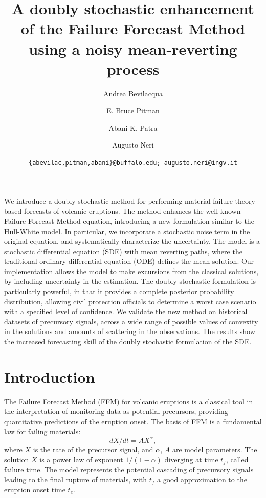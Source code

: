 \documentclass{article}
\begin{document}
\title{\bf A doubly stochastic enhancement of the Failure Forecast Method using a noisy mean-reverting process}
\author[1]{Andrea Bevilacqua}
\author[2]{E. Bruce Pitman}
\author[3,4]{Abani K. Patra}
\author[5]{Augusto Neri}


\date{\texttt{\{abevilac,pitman,abani\}@buffalo.edu; augusto.neri@ingv.it}}


\maketitle
\abstract
We introduce a doubly stochastic method for performing material failure theory based forecasts of volcanic eruptions. The method enhances the well known Failure Forecast Method equation, introducing a new formulation similar to the Hull-White model. In particular, we incorporate a stochastic noise term in the original equation, and systematically characterize the uncertainty. The model is a stochastic differential equation (SDE) with mean reverting paths, where the traditional ordinary differential equation (ODE) defines the mean solution. Our implementation allows the model to make excursions from the classical solutions, by including uncertainty in the estimation. The doubly stochastic formulation is particularly powerful, in that it provides a complete posterior probability distribution, allowing civil protection officials to determine a worst case scenario with a specified level of confidence. We validate the new method on historical datasets of precursory signals, across a wide range of possible values of convexity in the solutions and amounts of scattering in the observations. The results show the increased forecasting skill of the doubly stochastic formulation of the SDE.

\tableofcontents

\section{Introduction}
The Failure Forecast Method (FFM) for volcanic eruptions is a classical tool in the interpretation of monitoring data as potential precursors, providing quantitative predictions of the eruption onset. The basis of FFM is a fundamental law for failing materials:
$$dX/dt=AX^\alpha,$$
where $X$ is the rate of the precursor signal, and $\alpha$, $A$ are model parameters. The solution $X$ is a power law of exponent $1/(1-\alpha)$ diverging at time $t_f$, called failure time. The model represents the potential cascading of precursory signals leading to the final rupture of materials, with $t_f$ a good approximation to the eruption onset time $t_e$.
\end{document}

